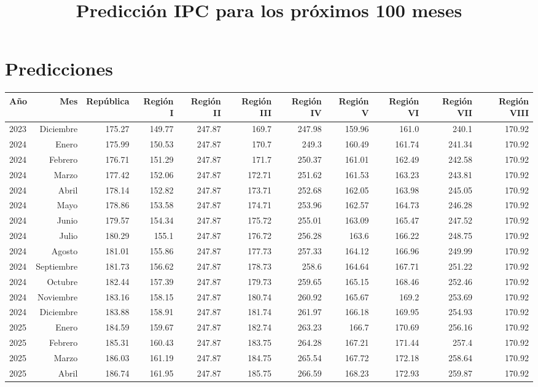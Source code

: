 \documentclass{article}%
\title{Predicción IPC para los próximos 100 meses}%
\date{}%
\begin{document}
%
\normalsize%
\maketitle%
\section{Predicciones}%
\label{sec:Predicciones}%
\begin{longtable}{|l r|r|r|r|r|r|r|r|r|r|}%
\hline%
Año&Mes&República&Región I&Región II&Región III&Región IV&Región V&Región VI&Región VII&Región VIII\\%
\hline%
2023&Diciembre&175.27&149.77&247.87&169.7&247.98&159.96&161.0&240.1&170.92\\%
2024&Enero&175.99&150.53&247.87&170.7&249.3&160.49&161.74&241.34&170.92\\%
2024&Febrero&176.71&151.29&247.87&171.7&250.37&161.01&162.49&242.58&170.92\\%
2024&Marzo&177.42&152.06&247.87&172.71&251.62&161.53&163.23&243.81&170.92\\%
2024&Abril&178.14&152.82&247.87&173.71&252.68&162.05&163.98&245.05&170.92\\%
2024&Mayo&178.86&153.58&247.87&174.71&253.96&162.57&164.73&246.28&170.92\\%
2024&Junio&179.57&154.34&247.87&175.72&255.01&163.09&165.47&247.52&170.92\\%
2024&Julio&180.29&155.1&247.87&176.72&256.28&163.6&166.22&248.75&170.92\\%
2024&Agosto&181.01&155.86&247.87&177.73&257.33&164.12&166.96&249.99&170.92\\%
2024&Septiembre&181.73&156.62&247.87&178.73&258.6&164.64&167.71&251.22&170.92\\%
2024&Octubre&182.44&157.39&247.87&179.73&259.65&165.15&168.46&252.46&170.92\\%
2024&Noviembre&183.16&158.15&247.87&180.74&260.92&165.67&169.2&253.69&170.92\\%
2024&Diciembre&183.88&158.91&247.87&181.74&261.97&166.18&169.95&254.93&170.92\\%
2025&Enero&184.59&159.67&247.87&182.74&263.23&166.7&170.69&256.16&170.92\\%
2025&Febrero&185.31&160.43&247.87&183.75&264.28&167.21&171.44&257.4&170.92\\%
2025&Marzo&186.03&161.19&247.87&184.75&265.54&167.72&172.18&258.64&170.92\\%
2025&Abril&186.74&161.95&247.87&185.75&266.59&168.23&172.93&259.87&170.92\\%

\end{longtable}
\end{document}
